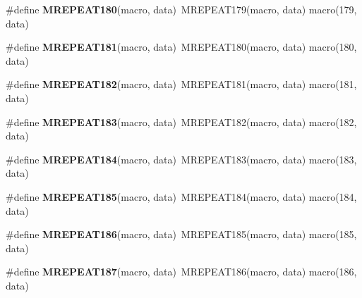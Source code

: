 \begin{DoxyCompactItemize}
\item 
\hypertarget{group__group__sam0__utils__mrepeat_ga131a0e131d380f253f0748364eb9cc3f}{}\#define {\bfseries M\+R\+E\+P\+E\+A\+T180}(macro,  data)~M\+R\+E\+P\+E\+A\+T179(macro, data)   macro(179, data)\label{group__group__sam0__utils__mrepeat_ga131a0e131d380f253f0748364eb9cc3f}

\item 
\hypertarget{group__group__sam0__utils__mrepeat_ga2596ba634c8c3cc9001bdb16a5228933}{}\#define {\bfseries M\+R\+E\+P\+E\+A\+T181}(macro,  data)~M\+R\+E\+P\+E\+A\+T180(macro, data)   macro(180, data)\label{group__group__sam0__utils__mrepeat_ga2596ba634c8c3cc9001bdb16a5228933}

\item 
\hypertarget{group__group__sam0__utils__mrepeat_ga958c679aab7f419465b7d099d790a944}{}\#define {\bfseries M\+R\+E\+P\+E\+A\+T182}(macro,  data)~M\+R\+E\+P\+E\+A\+T181(macro, data)   macro(181, data)\label{group__group__sam0__utils__mrepeat_ga958c679aab7f419465b7d099d790a944}

\item 
\hypertarget{group__group__sam0__utils__mrepeat_ga413ea4db626945b91fb34b078615b02c}{}\#define {\bfseries M\+R\+E\+P\+E\+A\+T183}(macro,  data)~M\+R\+E\+P\+E\+A\+T182(macro, data)   macro(182, data)\label{group__group__sam0__utils__mrepeat_ga413ea4db626945b91fb34b078615b02c}

\item 
\hypertarget{group__group__sam0__utils__mrepeat_ga7b8a834a1fbd1d3dcfa95f0d3724835f}{}\#define {\bfseries M\+R\+E\+P\+E\+A\+T184}(macro,  data)~M\+R\+E\+P\+E\+A\+T183(macro, data)   macro(183, data)\label{group__group__sam0__utils__mrepeat_ga7b8a834a1fbd1d3dcfa95f0d3724835f}

\item 
\hypertarget{group__group__sam0__utils__mrepeat_ga72fd4bb3bee8d7ae45897345c0ca13d1}{}\#define {\bfseries M\+R\+E\+P\+E\+A\+T185}(macro,  data)~M\+R\+E\+P\+E\+A\+T184(macro, data)   macro(184, data)\label{group__group__sam0__utils__mrepeat_ga72fd4bb3bee8d7ae45897345c0ca13d1}

\item 
\hypertarget{group__group__sam0__utils__mrepeat_gaffac3b38c0b0a12816b6620ebd99d6a9}{}\#define {\bfseries M\+R\+E\+P\+E\+A\+T186}(macro,  data)~M\+R\+E\+P\+E\+A\+T185(macro, data)   macro(185, data)\label{group__group__sam0__utils__mrepeat_gaffac3b38c0b0a12816b6620ebd99d6a9}

\item 
\hypertarget{group__group__sam0__utils__mrepeat_ga694587833aed28be3a88e364ef3adbd3}{}\#define {\bfseries M\+R\+E\+P\+E\+A\+T187}(macro,  data)~M\+R\+E\+P\+E\+A\+T186(macro, data)   macro(186, data)\label{group__group__sam0__utils__mrepeat_ga694587833aed28be3a88e364ef3adbd3}


\end{DoxyCompactItemize}

